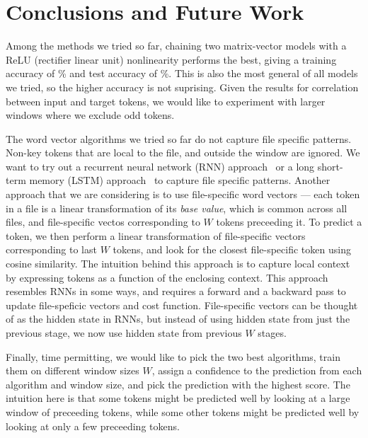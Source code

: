 \section{Conclusions and Future Work}
\label{sec:conclusions}

\noindent
Among the methods we tried so far, chaining two matrix-vector models with a
ReLU (rectifier linear unit) nonlinearity performs the best, giving
a training accuracy of \% and test accuracy of \%.
This is also the most general of all models we tried, so
the higher accuracy is not suprising. Given the results for correlation between
input and target tokens, we would like to experiment with larger windows
where we exclude odd tokens.

The word vector algorithms we tried so far do not capture file specific
patterns. Non-key tokens that are local to the file, and outside the window are
ignored. We want to try out a recurrent neural network (RNN)
approach~\cite{rnn} or a long short-term memory (LSTM) approach~\cite{lstm,
rnnlstm} to
capture file specific patterns. Another approach that we are considering is to
use file-specific word vectors --- each token in a file is a linear
transformation of its \emph{base value}, which is common across all files, and
file-specific vectos corresponding to $W$ tokens preceeding it.
To predict a token, we then perform a linear transformation of file-specific
vectors corresponding to last $W$ tokens, and look for the closest
file-specific token using cosine similarity. The intuition behind this approach
is to capture local context by expressing tokens as a function of the enclosing
context. This approach resembles RNNs in some ways, and requires a forward and
a backward pass to update file-speficic vectors and cost function.
File-specific vectors can be thought of as the hidden state in RNNs, but
instead of using hidden state from just the previous stage, we now use
hidden state from previous $W$ stages.

Finally, time permitting,
we would like to pick the two best algorithms, train them on different
window sizes $W$, assign a confidence to the prediction from each algorithm and
window size, and pick the prediction with the highest score.
The intuition here is that some tokens might be predicted well by
looking at a large window of preceeding tokens, while some other tokens might
be predicted well by looking at only a few preceeding tokens.
